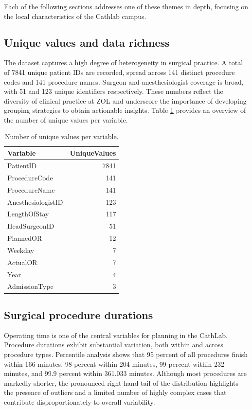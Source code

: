 \documentclass[
]{article}
\begin{document}
Each of the following sections addresses one of these themes in depth,
focusing on the local characteristics of the Cathlab campus.

\subsection{Unique values and data
richness}\label{unique-values-and-data-richness}

The dataset captures a high degree of heterogeneity in surgical
practice. A total of 7841 unique patient IDs are recorded, spread across
141 distinct procedure codes and 141 procedure names. Surgeon and
anesthesiologist coverage is broad, with 51 and 123 unique identifiers
respectively. These numbers reflect the diversity of clinical practice
at ZOL and underscore the importance of developing grouping strategies
to obtain actionable insights. Table \ref{tab:uniquevalues} provides an
overview of the number of unique values per variable.

\begin{table}[H]

\caption{\label{tab:unique values}Number of unique values per variable. \label{tab:uniquevalues}}
\centering
\begin{tabular}[t]{lr}
\toprule
Variable & UniqueValues\\
\midrule
PatientID & 7841\\
ProcedureCode & 141\\
ProcedureName & 141\\
AnesthesiologistID & 123\\
LengthOfStay & 117\\
\addlinespace
HeadSurgeonID & 51\\
PlannedOR & 12\\
Weekday & 7\\
ActualOR & 7\\
Year & 4\\
\addlinespace
AdmissionType & 3\\
\bottomrule
\end{tabular}
\end{table}

\subsection{Surgical procedure
durations}\label{surgical-procedure-durations}

Operating time is one of the central variables for planning in the
CathLab. Procedure durations exhibit substantial variation, both within
and across procedure types. Percentile analysis shows that 95 percent of
all procedures finish within 166 minutes, 98 percent within 204 minutes,
99 percent within 232 minutes, and 99.9 percent within 361.033 minutes.
Although most procedures are markedly shorter, the pronounced right-hand
tail of the distribution highlights the presence of outliers and a
limited number of highly complex cases that contribute
disproportionately to overall variability.
\end{document}
